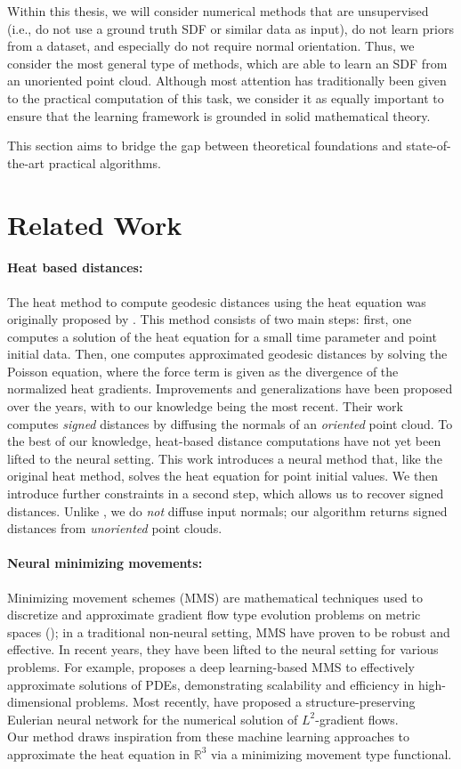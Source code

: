 \documentclass[12pt,openany]{book}
\newcommand{\R}{\mathbb{R}}
\theoremstyle{plainnormal}
\theoremstyle{remark}
\begin{document}
Within this thesis, we will consider numerical methods that are unsupervised (i.e., do not use a ground truth SDF or similar data as input), do not learn priors from a dataset, and especially do not require normal orientation. Thus, we consider the most general type of methods, which are able to learn an SDF from an unoriented point cloud. Although most attention has traditionally been given to the practical computation of this task, we consider it as equally important to ensure that the learning framework is grounded in solid mathematical theory. \par
This section aims to bridge the gap between theoretical foundations and state-of-the-art practical algorithms.
\section{Related Work} \label{SDF_rel_work}
\paragraph{Heat based distances:}
The heat method to compute geodesic distances using the heat equation was originally proposed by \cite{Crane_2013, Crane:2017:HMD}. This method consists of two main steps: first, one computes a solution of the heat equation for a small time parameter and point initial data. Then, one computes approximated geodesic distances by solving the Poisson equation, where the force term is given as the divergence of the normalized heat gradients. Improvements and generalizations have been proposed over the years, with \cite{FengCrane} to our knowledge being the most recent. Their work computes \emph{signed} distances by diffusing the normals of an \emph{oriented} point cloud. To the best of our knowledge, heat-based distance computations have not yet been lifted to the neural setting. This work introduces a neural method that, like the original heat method, solves the heat equation for point initial values. We then introduce further constraints in a second step, which allows us to recover signed distances. Unlike \cite{FengCrane}, we do \emph{not} diffuse input normals; our algorithm returns signed distances from \emph{unoriented} point clouds.
\paragraph{Neural minimizing movements:}
Minimizing movement schemes (MMS) are mathematical techniques used to discretize and approximate gradient flow type evolution problems on metric spaces (\cite{de1993new}); in a traditional non-neural setting, MMS have proven to be robust and effective. In recent years, they have been lifted to the neural setting for various problems. For example, \cite{park2023deep} proposes a deep learning-based MMS to effectively approximate solutions of PDEs, demonstrating scalability and efficiency in high-dimensional problems. Most recently, \cite{hu2024energetic} have proposed a structure-preserving Eulerian neural network for the numerical solution of $L^2$-gradient flows.\\
Our method draws inspiration from these machine learning approaches to approximate the heat equation in $\R^3$ via a minimizing movement type functional.
\end{document}
